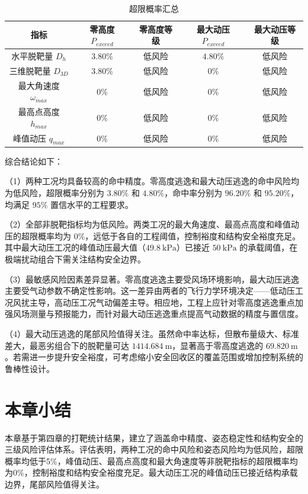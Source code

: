 \begin{table}[htbp]
\caption{超限概率汇总}
\label{tab:exceed_summary}
\begin{tabularx}{\textwidth}{CCCCC}
\toprule
指标 & 零高度 $P_{exceed}$ & 零高度等级 & 最大动压 $P_{exceed}$ & 最大动压等级 \\
\midrule
水平脱靶量 $D_h$ & $3.80\%$ & 低风险 & $4.80\%$ & 低风险 \\
三维脱靶量 $D_{3D}$ & $3.80\%$ & 低风险 & $0\%$ & 低风险 \\
最大角速度 $\omega_{max}$ & $0\%$ & 低风险 & $0\%$ & 低风险 \\
最高点高度 $h_{max}$ & $0\%$ & 低风险 & $0\%$ & 低风险 \\
峰值动压 $q_{max}$ & $0\%$ & 低风险 & $0\%$ & 低风险 \\
\bottomrule
\end{tabularx}
\end{table}

综合结论如下：

（1）两种工况均具备较高的命中精度。零高度逃逸和最大动压逃逸的命中风险均为低风险，超限概率分别为 $3.80\%$ 和 $4.80\%$，命中率分别为 $96.20\%$ 和 $95.20\%$，均满足 $95\%$ 置信水平的工程要求。

（2）全部非脱靶指标均为低风险。两类工况的最大角速度、最高点高度和峰值动压的超限概率均为 $0\%$，远低于各自的工程阈值，控制裕度和结构安全裕度充足。其中最大动压工况的峰值动压最大值（$49.8\ \mathrm{kPa}$）已接近 $50\ \mathrm{kPa}$ 的承载阈值，在极端扰动组合下需关注结构安全边界。

（3）最敏感风险因素差异显著。零高度逃逸主要受风场环境影响，最大动压逃逸主要受气动参数不确定性影响。这一差异由两者的飞行力学环境决定——低动压工况风扰主导，高动压工况气动偏差主导。相应地，工程上应针对零高度逃逸重点加强风场测量与预报能力，而针对最大动压逃逸重点提高气动数据的精度与置信度。

（4）最大动压逃逸的尾部风险值得关注。虽然命中率达标，但散布量级大、标准差大，最恶劣组合下的脱靶量可达 $1414.684\ \mathrm m$，显著高于零高度逃逸的 $69.820\ \mathrm m$。若需进一步提升安全裕度，可考虑缩小安全回收区的覆盖范围或增加控制系统的鲁棒性设计。

\section{本章小结}

本章基于第四章的打靶统计结果，建立了涵盖命中精度、姿态稳定性和结构安全的三级风险评估体系。评估表明，两种工况的命中风险和姿态风险均为低风险，超限概率均低于5\%，峰值动压、最高点高度和最大角速度等非脱靶指标的超限概率均为0\%，控制裕度和结构安全裕度充足。最大动压工况的峰值动压已接近结构承载边界，尾部风险值得关注。
